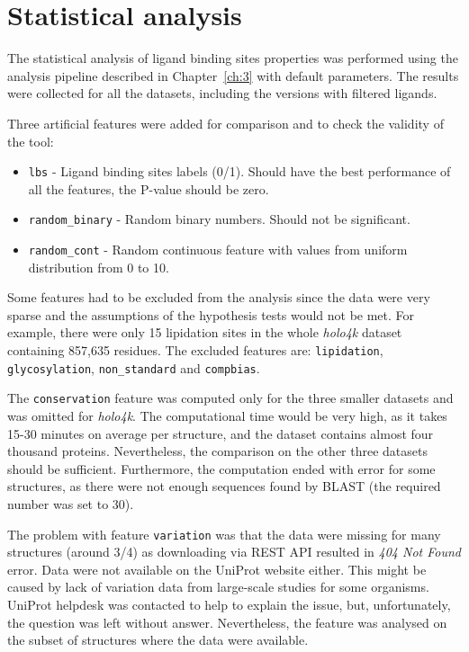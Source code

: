 \section{Statistical analysis}

The statistical analysis of ligand binding sites properties was performed using the analysis pipeline described in Chapter~\ref{ch:3} with default parameters. The results were collected for all the datasets, including the versions with filtered ligands.

Three artificial features were added for comparison and to check the validity of the tool:
\begin{itemize}
  \item \texttt{lbs} - Ligand binding sites labels (0/1). Should have the best performance of all the features, the P-value should be zero.
  \item \texttt{random\_binary} - Random binary numbers. Should not be significant.
  \item \texttt{random\_cont} - Random continuous feature with values from uniform distribution from 0 to 10.
\end{itemize}

Some features had to be excluded from the analysis since the data were very sparse and the assumptions of the hypothesis tests would not be met. For example, there were only 15 lipidation sites in the whole \textit{holo4k} dataset containing  857,635 residues. The excluded features are: \texttt{lipidation}, \texttt{glycosylation}, \texttt{non\_standard} and \texttt{compbias}.

The \texttt{conservation} feature was computed only for the three smaller datasets and was omitted for \textit{holo4k}. The computational time would be very high, as it takes 15-30 minutes on average per structure, and the dataset contains almost four thousand proteins. Nevertheless, the comparison on the other three datasets should be sufficient. Furthermore, the computation ended with error for some structures, as there were not enough sequences found by BLAST (the required number was set to 30).

The problem with feature \texttt{variation} was that the data were missing for many structures (around 3/4) as downloading via REST API resulted in \textit{404 Not Found} error. Data were not available on the UniProt website either. This might be caused by lack of variation data from large-scale studies for some organisms. UniProt helpdesk was contacted to help to explain the issue, but, unfortunately, the question was left without answer. Nevertheless, the feature was analysed on the subset of structures where the data were available.

